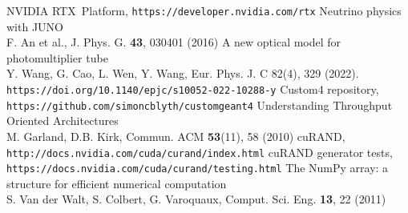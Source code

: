 \documentclass{webofc}
\begin{document}
\begin{thebibliography}{}
NVIDIA RTX\texttrademark\, Platform, {\tt https://developer.nvidia.com/rtx}
Neutrino physics with JUNO \\
F. An et al., J. Phys. G. {\bf 43}, 030401 (2016) 
%
A new optical model for photomultiplier tube\\
Y. Wang, G. Cao, L. Wen, Y. Wang, Eur. Phys. J. C 82(4), 329 (2022).\\
{\tt https://doi.org/10.1140/epjc/s10052-022-10288-y}
%
Custom4 repository, {\tt https://github.com/simoncblyth/customgeant4}
%
Understanding Throughput Oriented Architectures \\
M. Garland, D.B. Kirk, Commun. ACM {\bf 53}(11), 58 (2010) 
cuRAND, {\tt http://docs.nvidia.com/cuda/curand/index.html}
%
cuRAND generator tests, {\tt https://docs.nvidia.com/cuda/curand/testing.html}
The NumPy array: a structure for efficient numerical computation \\
S. Van der Walt, S. Colbert, G. Varoquaux, Comput. Sci. Eng. {\bf 13}, 22 (2011)
%
\end{thebibliography}
%
\end{document}
